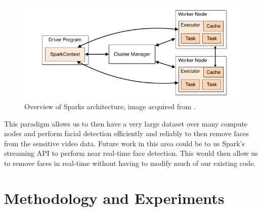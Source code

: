 \documentclass[
	submission,
	final,
	notitlepage,
	narroweqnarray,
	inline,
	twoside,
	]{ieee}
\begin{document}
\begin{figure}[h]
\centering
\includegraphics[width=\linewidth]{figures/spark_model}
\caption{Overview of Sparks architecture, image acquired from \cite{spark}.}
\label{fig:spark_model}
\end{figure}
\FloatBarrier

This paradigm allows us to then have a very large dataset over many compute
nodes and perform facial detection efficiently and reliably to then
remove faces from the sensitive video data. Future work in this area
could be to us Spark's streaming API to perform near real-time face detection.
This would then allow us to remove faces in real-time without having to
modify much of our existing code.

\section{Methodology and Experiments}
\end{document}
